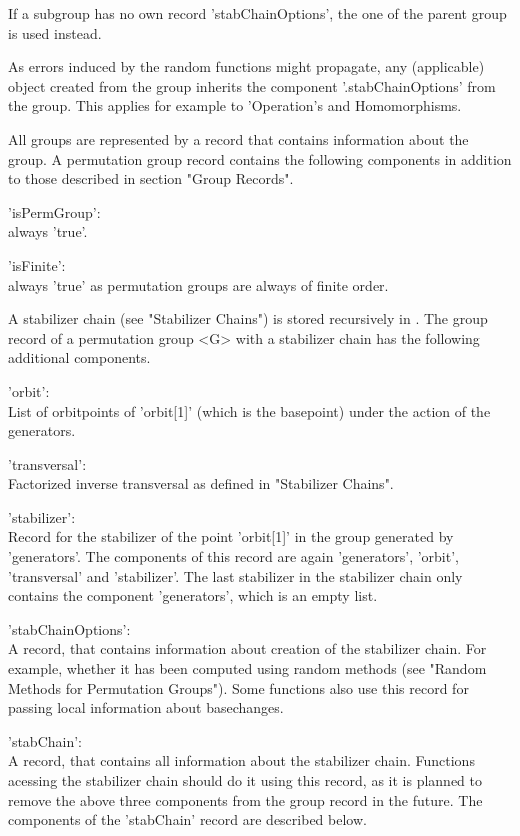 If a subgroup has no own record 'stabChainOptions', the one of the parent
group is used instead.

As errors induced by the random functions might propagate, any
(applicable) object created from the group inherits the component
'.stabChainOptions' from the group. This applies for example to
'Operation's and Homomorphisms.


All  groups are represented by a record that contains  information  about
the  group.  A permutation group record contains the following components
in addition to those described in section "Group Records".

'isPermGroup': \\
        always 'true'.

'isFinite': \\
        always 'true' as permutation groups are always of finite order.

A  stabilizer  chain (see "Stabilizer Chains") is  stored recursively  in
{\GAP}.   The group record  of a permutation group <G>  with a stabilizer
chain has the following additional components.

'orbit':  \\
        List of orbitpoints of 'orbit[1]'  (which is the basepoint) under
        the action of the generators.

'transversal': \\
        Factorized inverse transversal as defined in "Stabilizer Chains".

'stabilizer': \\
        Record for the  stabilizer  of the point 'orbit[1]' in the  group
        generated  by  'generators'.  The components  of this  record are
        again 'generators', 'orbit', 'transversal' and 'stabilizer'.  The
        last  stabilizer  in  the  stabilizer  chain  only  contains  the
        component 'generators', which is an empty list.

'stabChainOptions': \\
	A record, that contains information about creation of the stabilizer
	chain. For example, whether it has been computed using random methods
	(see "Random Methods for Permutation Groups"). Some functions also
	use this record for passing local information about basechanges.

'stabChain': \\
	A record, that contains all information about the stabilizer chain.
	Functions acessing the stabilizer chain should do it using this
	record, as it is planned to remove the above three components from
	the group record in the future. The components of the 'stabChain'
	record are described below.

